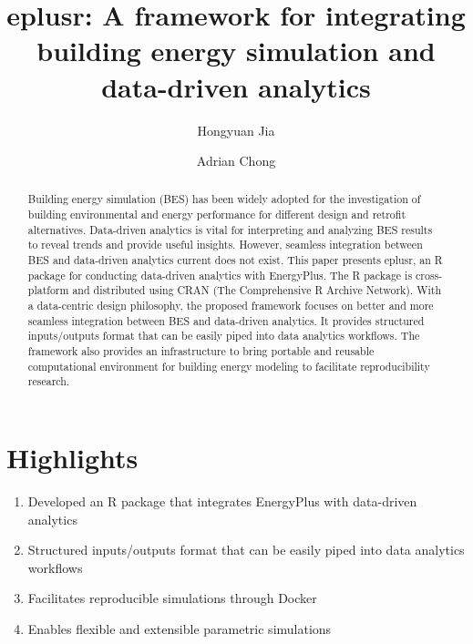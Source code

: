 \documentclass[3p, times]{elsarticle} %
\providecommand{\tightlist}{%
  \setlength{\itemsep}{0pt}\setlength{\parskip}{0pt}}
\begin{document}
\begin{frontmatter}

  \title{eplusr: A framework for integrating building energy simulation and data-driven analytics}
    \author[SinBerBEST]{Hongyuan Jia}
    \author[NUS]{Adrian Chong}
      \address[SinBerBEST]{SinBerBEST Program, Berkeley Education Alliance for Research in Singapore,
Singapore, 138602, Singapore}
    \address[NUS]{Department of Building, School of Design and Environment, National
University of Singapore, 4 Architecture Drive, Singapore, 117566,
Singapore}
  
  \begin{abstract}
  Building energy simulation (BES) has been widely adopted for the
  investigation of building environmental and energy performance for different
  design and retrofit alternatives.
  Data-driven analytics is vital for interpreting and analyzing BES results to
  reveal trends and provide useful insights.
  However, seamless integration between BES and data-driven analytics current
  does not exist.
  This paper presents eplusr, an R package for conducting data-driven analytics
  with EnergyPlus.
  The R package is cross-platform and distributed using CRAN (The Comprehensive
  R Archive Network).
  With a data-centric design philosophy, the proposed framework focuses on
  better and more seamless integration between BES and data-driven analytics.
  It provides structured inputs/outputs format that can be easily piped into
  data analytics workflows.
  The framework also provides an infrastructure to bring portable and reusable
  computational environment for building energy modeling to facilitate
  reproducibility research.
  \end{abstract}
  
 \end{frontmatter}

\hypertarget{highlights}{%
\section*{Highlights}\label{highlights}}

\begin{enumerate}
\def\labelenumi{\arabic{enumi}.}
\tightlist
\item
  Developed an R package that integrates EnergyPlus with data-driven analytics
\item
  Structured inputs/outputs format that can be easily piped into data
  analytics workflows
\item
  Facilitates reproducible simulations through Docker
\item
  Enables flexible and extensible parametric simulations
\end{enumerate}
\end{document}
